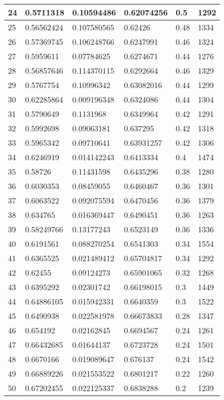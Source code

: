 \begin{longtable}{|l|l|l|l|l|l|}
24 & 0.5711318 & 0.10594486 & 0.62074256 & 0.5 & 1292 \\ \hline 
25 & 0.56562424 & 0.107580565 & 0.62426 & 0.48 & 1334 \\ \hline 
26 & 0.57369745 & 0.106248766 & 0.6247991 & 0.46 & 1324 \\ \hline 
27 & 0.5959611 & 0.07784625 & 0.6274671 & 0.44 & 1276 \\ \hline 
28 & 0.56857646 & 0.114370115 & 0.6292664 & 0.46 & 1329 \\ \hline 
29 & 0.5767754 & 0.10996342 & 0.63082016 & 0.44 & 1299 \\ \hline 
30 & 0.62285864 & 0.009196348 & 0.6324086 & 0.44 & 1304 \\ \hline 
31 & 0.5790649 & 0.1131968 & 0.6349964 & 0.42 & 1291 \\ \hline 
32 & 0.5992698 & 0.09063181 & 0.637295 & 0.42 & 1318 \\ \hline 
33 & 0.5965342 & 0.09710641 & 0.63931257 & 0.42 & 1306 \\ \hline 
34 & 0.6246919 & 0.014142243 & 0.6413334 & 0.4 & 1474 \\ \hline 
35 & 0.58726 & 0.11431598 & 0.6435296 & 0.38 & 1280 \\ \hline 
36 & 0.6030353 & 0.08459055 & 0.6460467 & 0.36 & 1301 \\ \hline 
37 & 0.6063522 & 0.092075594 & 0.6470456 & 0.36 & 1379 \\ \hline 
38 & 0.634765 & 0.016369447 & 0.6490451 & 0.36 & 1263 \\ \hline 
39 & 0.58249766 & 0.13177243 & 0.6523149 & 0.36 & 1336 \\ \hline 
40 & 0.6191561 & 0.088270254 & 0.6541303 & 0.34 & 1554 \\ \hline 
41 & 0.6365525 & 0.021489412 & 0.65704817 & 0.34 & 1292 \\ \hline 
42 & 0.62455 & 0.09124273 & 0.65901065 & 0.32 & 1268 \\ \hline 
43 & 0.6395292 & 0.02301742 & 0.66198015 & 0.3 & 1449 \\ \hline 
44 & 0.64886105 & 0.015942331 & 0.6640359 & 0.3 & 1522 \\ \hline 
45 & 0.6490938 & 0.022581978 & 0.66673833 & 0.28 & 1347 \\ \hline 
46 & 0.654192 & 0.02162845 & 0.6694567 & 0.24 & 1261 \\ \hline 
47 & 0.66432685 & 0.01644137 & 0.6723728 & 0.24 & 1501 \\ \hline 
48 & 0.6670166 & 0.019089647 & 0.676137 & 0.24 & 1542 \\ \hline 
49 & 0.66889226 & 0.021553522 & 0.6801217 & 0.22 & 1260 \\ \hline 
50 & 0.67202455 & 0.022125337 & 0.6838288 & 0.2 & 1239 \\ \hline 
\end{longtable}
